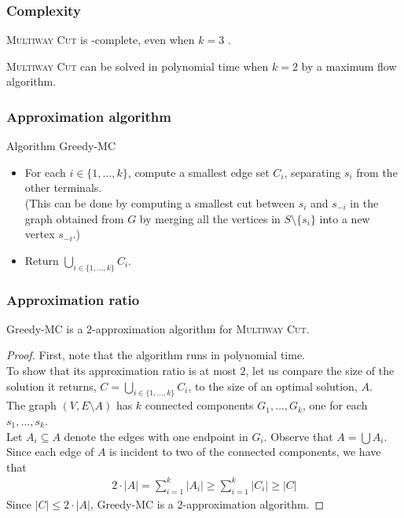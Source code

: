 \begin{frame}
	\frametitle{Complexity}
	
	\textsc{Multiway Cut} is \NP-complete, even when $k=3$ \cite{DahlhausJPSZ94}.
	
	\textsc{Multiway Cut} can be solved in polynomial time when $k=2$ by a maximum flow algorithm.
\end{frame}

\begin{frame}
	\frametitle{Approximation algorithm}
	
	Algorithm Greedy-MC
	\begin{itemize}
		\item For each $i\in \{1,\dots,k\}$, compute a smallest edge set $C_i$, separating $s_i$ from the other terminals.\\
			(This can be done by computing a smallest cut between $s_i$ and $s_{-i}$ in the graph obtained from $G$ by merging all the vertices in $S\setminus \{s_i\}$ into a new vertex $s_{-i}$.)
		\item Return $\bigcup_{i\in \{1,\dots,k\}} C_i$.
	\end{itemize}
\end{frame}

\begin{frame}
	\frametitle{Approximation ratio}
	
	\begin{theorem}
		Greedy-MC is a 2-approximation algorithm for \textsc{Multiway Cut}.
	\end{theorem}
	\begin{proof}
	 First, note that the algorithm runs in polynomial time.\\
	 To show that its approximation ratio is at most $2$, let us compare the size of the solution it returns, $C = \bigcup_{i\in \{1,\dots,k\}} C_i$, to the size of an optimal solution, $A$.\\
	 The graph $(V,E\setminus A)$ has $k$ connected components $G_1, \dots, G_k$, one for each $s_1, \dots, s_k$.\\
	 Let $A_i\subseteq A$ denote the edges with one endpoint in $G_i$. Observe that $A = \bigcup A_i$.\\
	 Since each edge of $A$ is incident to two of the connected components, we have that
	 \begin{align*}
	 	 2\cdot |A| = \sum_{i=1}^k |A_i| \ge \sum_{i=1}^k |C_i| \ge |C|
	 \end{align*}
	 Since $|C|\le 2\cdot |A|$, Greedy-MC is a 2-approximation algorithm.
	\end{proof}
\end{frame}

